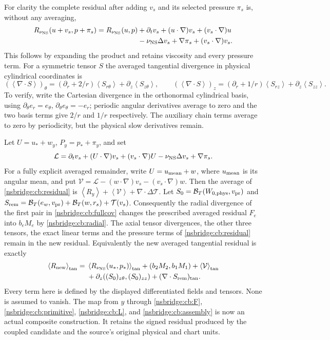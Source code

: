 \documentclass[11pt]{article}
\newcommand{\av}[1]{\left\langle #1\right\rangle}
\begin{document}
For clarity the complete residual after adding $v_s$ and its selected
pressure $\pi_s$ is, without any averaging,
\begin{align}
 R_{\nu_{\rm NS}}(u+v_s,p+\pi_s)
 =R_{\nu_{\rm NS}}(u,p)
 &+\partial_tv_s+(u\cdot\nabla)v_s+(v_s\cdot\nabla)u \nonumber\\
 &-\nu_{\rm NS}\Delta v_s+\nabla\pi_s
 +(v_s\cdot\nabla)v_s . \label{nsbridge:cb:residual}
\end{align}
This follows by expanding the product and retains viscosity and every
pressure term. For a symmetric tensor $S$ the averaged tangential
divergence in physical cylindrical coordinates is
\[
 (\av{\nabla\cdot S})_\theta
   =(\partial_r+2/r)\av{S_{r\theta}}+\partial_z\av{S_{z\theta}},
 \qquad
 (\av{\nabla\cdot S})_z
   =(\partial_r+1/r)\av{S_{rz}}+\partial_z\av{S_{zz}} .
\]
To verify, write the Cartesian divergence in the orthonormal cylindrical
basis, using $\partial_\theta e_r=e_\theta$,
$\partial_\theta e_\theta=-e_r$; periodic angular derivatives average
to zero and the two basis terms give $2/r$ and $1/r$ respectively.
The auxiliary chain terms average to zero by periodicity, but the
physical slow derivatives remain.

Let $U=u_*+w_y$, $P_y=p_*+\pi_y$, and set
\[
 \mathcal L=
 \partial_tv_s+(U\cdot\nabla)v_s+(v_s\cdot\nabla)U
 -\nu_{\rm NS}\Delta v_s+\nabla\pi_s .
\]
For a fully explicit averaged remainder, write $U=u_{\rm mean}+w$,
where $u_{\rm mean}$ is its angular mean, and put
$\mathcal V=\mathcal L-(w\cdot\nabla)v_s-(v_s\cdot\nabla)w$.
Then the average of \eqref{nsbridge:cb:residual} is
$\av{R_y}+\av{\mathcal V}+\nabla\cdot\Delta\mathcal T$.
Let $S_0=\mathcal B_T(W_{0,\rm phys},v_{\rm pr})$ and
$S_{\rm rem}=\mathcal B_T(e_w,v_{\rm pr})
 +\mathcal B_T(w,r_s)+\mathcal T(v_s)$.
Consequently the radial divergence of the first pair in
\eqref{nsbridge:cb:fullcov} changes the prescribed averaged residual $F_e$ into
$b_eM_e$ by \eqref{nsbridge:cb:radial}. The axial tensor divergences, the other
three tensors, the exact linear terms and the pressure terms of
\eqref{nsbridge:cb:residual} remain in the new residual. Equivalently the new
averaged tangential residual is exactly
\begin{align*}
 \av{R_{\rm new}}_{\rm tan}
 ={}&\av{R_{\nu_{\rm NS}}(u_*,p_*)}_{\rm tan}
 +(b_2M_2,b_1M_1)+\av{\mathcal V}_{\rm tan}\\
 &+\partial_z((S_0)_{z\theta},(S_0)_{zz})
   +(\nabla\cdot S_{\rm rem})_{\rm tan}.
\end{align*}
Every term here is defined by the displayed differentiated fields and
tensors. None is assumed to vanish.
The map from $y$ through \eqref{nsbridge:cb:F}, \eqref{nsbridge:cb:primitive},
\eqref{nsbridge:cb:L}, and \eqref{nsbridge:cb:assembly} is now an actual composite
construction. It retains the signed residual produced by the coupled
candidate and the source's original physical and chart units.
\end{document}
